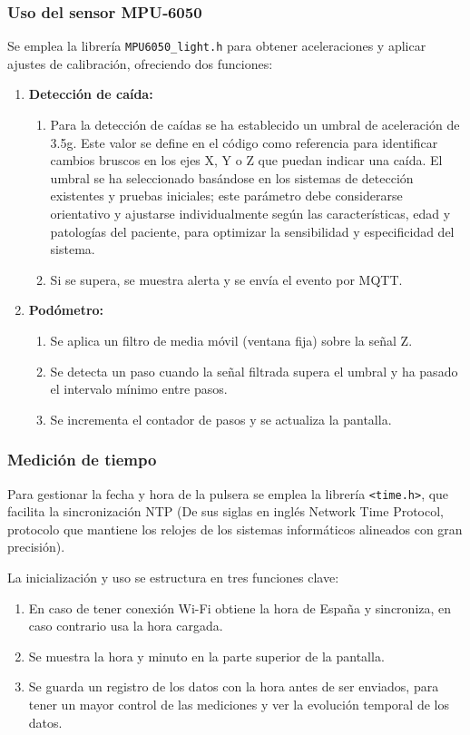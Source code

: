 \documentclass[12pt, a4paper]{article}
\begin{document}
	\subsubsection{Uso del sensor MPU‑6050}
	Se emplea la librería \texttt{MPU6050\_light.h} para obtener aceleraciones y aplicar ajustes de calibración, ofreciendo dos funciones:
	
	\begin{enumerate}
		\item \textbf{Detección de caída:}
		\begin{enumerate}
			\item Para la detección de caídas se ha establecido un umbral de aceleración de 3.5g. Este valor se define en el código como referencia para identificar cambios bruscos en los ejes X, Y o Z que puedan indicar una caída. El umbral se ha seleccionado basándose en los sistemas de detección existentes y pruebas iniciales; este parámetro debe considerarse orientativo y ajustarse individualmente según las características, edad y patologías del paciente, para optimizar la sensibilidad y especificidad del sistema.
			\item Si se supera, se muestra alerta y se envía el evento por MQTT.
		\end{enumerate}
		\item \textbf{Podómetro:}
		\begin{enumerate}
			\item Se aplica un filtro de media móvil (ventana fija) sobre la señal Z.
			\item Se detecta un paso cuando la señal filtrada supera el umbral y ha pasado el intervalo mínimo entre pasos.
			\item Se incrementa el contador de pasos y se actualiza la pantalla.
		\end{enumerate}
	\end{enumerate}
	

	\subsubsection{Medición de tiempo}
	Para gestionar la fecha y hora de la pulsera se emplea la librería \texttt{<time.h>}, que facilita la sincronización NTP (De sus siglas en inglés Network Time Protocol, protocolo que mantiene los relojes de los sistemas informáticos alineados con gran precisión).
	
	La inicialización y uso se estructura en tres funciones clave:
	\begin{enumerate}
		\item En caso de tener conexión Wi-Fi obtiene la hora de España y sincroniza, en caso contrario usa la hora cargada.
		\item Se muestra la hora y minuto en la parte superior de la pantalla.
		\item Se guarda un registro de los datos con la hora antes de ser enviados, para tener un mayor control de las mediciones y ver la evolución temporal de los datos.
	\end{enumerate}
	
\end{document}
